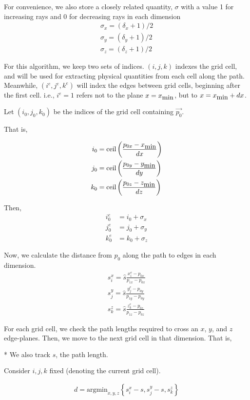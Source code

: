 For convenience, we also store a closely related quantity, $\sigma$ with a value 1 for
increasing rays and 0 for decreasing rays in each dimension
\begin{align}
  \sigma_x = (\delta_x+1)/2 \\
  \sigma_y = (\delta_y+1)/2 \\
  \sigma_z = (\delta_z+1)/2
\end{align}

For this algorithm, we keep two sets of indices. $(i,j,k)$ indexes the grid
cell, and will be used for extracting physical quantities from each cell along
the path.
Meanwhile, $(i^e,j^e,k^e)$ will index the edges between grid cells, beginning
after the first cell. i.e., $i^e=1$ refers not to the plane $x=x_{\mbox{min}}$, but to $x=x_{\mbox{min}}+dx$.

Let $(i_0, j_0, k_0)$ be the indices of the grid cell containing $\vec{p_0}$.

That is,

\begin{align}
  i_0 &= \mbox{ceil}\left(\frac{p_{0x}-x_{\mbox{min}}}{dx}\right) \\
  j_0 &= \mbox{ceil}\left(\frac{p_{0y}-y_{\mbox{min}}}{dy}\right) \\
  k_0 &= \mbox{ceil}\left(\frac{p_{0z}-z_{\mbox{min}}}{dz}\right)
\end{align}

Then,
\begin{align}
  i_0^e &= i_0 + \sigma_x \\
  j_0^e &= j_0 + \sigma_y \\
  k_0^e &= k_0 + \sigma_z
\end{align}

Now, we calculate the distance from $p_0$ along the path to edges in each dimension.
\begin{align}
  s_i^x = \hat{s}\frac{x_i^e-p_{0x}}{p_{1x}-p_{0x}} \\
  s_j^y = \hat{s}\frac{y_j^e-p_{0y}}{p_{1y}-p_{0y}} \\
  s_k^z = \hat{s}\frac{z_k^e-p_{0z}}{p_{1z}-p_{0z}}
\end{align}

For each grid cell, we check the path lengths required to cross an $x$, $y$, and
$z$ edge-planes.
Then, we move to the next grid cell in that dimension.
That is,

* We also track $s$, the path length.

Consider $i,j,k$ fixed (denoting the current grid cell).

\begin{align}  
  d = \mbox{argmin}_{x,y,z} \left\{ s_i^x-s, s_j^y-s, s_k^z \right\}
\end{align}

